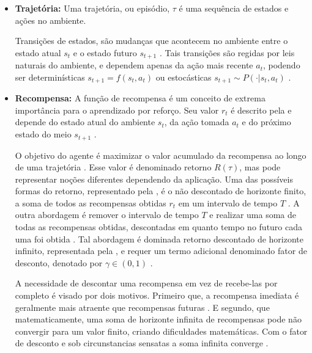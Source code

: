 \begin{itemize}
    \item \textbf{Trajetória:} Uma trajetória, ou episódio, $\tau$ é uma sequência de estados e ações no ambiente.


    Transições de estados, são mudanças que acontecem no ambiente entre o estado atual $s_t$ e o estado futuro $s_{t+1}$ \cite{rl_intro}. Tais transições são regidas por leis naturais do ambiente, e dependem apenas da ação mais recente $a_t$, podendo ser determinísticas $s_{t+1} = f(s_t, a_t)$ ou estocásticas $s_{t+1} \sim P(\cdot|s_t, a_t)$ \cite{rl_intro}.

    \item \textbf{Recompensa:} A função de recompensa é um conceito de extrema importância para o aprendizado por reforço. Seu valor $r_t$ é descrito pela  e depende do estado atual do ambiente $s_t$, da ação tomada $a_t$ e do próximo estado do meio $s_{t+1}$ \cite{rl_intro}.


    O objetivo do agente é maximizar o valor acumulado da recompensa ao longo de uma trajetória \cite{rl_intro}. Esse valor é denominado retorno $R(\tau)$, mas pode representar noções diferentes dependendo da aplicação. Uma das possíveis formas do retorno, representado pela , é o não descontado de horizonte finito, a soma de todos as recompensas obtidas $r_t$ em um intervalo de tempo $T$ \cite{deeprl}. A outra abordagem é remover o intervalo de tempo $T$ e realizar uma soma de todas as recompensas obtidas, descontadas em quanto tempo no futuro cada uma foi obtida \cite{rl_intro}. Tal abordagem é dominada retorno descontado de horizonte infinito, representada pela , e requer um termo adicional denominado fator de desconto, denotado por $\gamma \in (0,1)$ \cite{machinelearning}.


    A necessidade de descontar uma recompensa em vez de recebe-las por completo é visado por dois motivos. Primeiro que, a recompensa imediata é geralmente mais atraente que recompensas futuras \cite{SpinningUp2018}. E segundo, que matematicamente, uma soma de horizonte infinita de recompensas pode não convergir para um valor finito, criando dificuldades matemáticas. Com o fator de desconto e sob circunstancias sensatas a soma infinita converge \cite{SpinningUp2018}.
    

\end{itemize}

